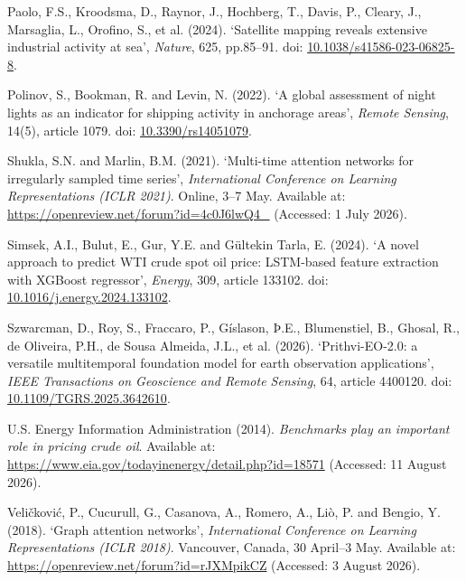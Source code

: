 \documentclass[
  british,
  12pt,
  oneside]{book}
\newlength{\cslhangindent}
\newenvironment{CSLReferences}[2] %
 {\begin{list}{}{%
  \setlength{\itemindent}{0pt}
  \setlength{\leftmargin}{0pt}
  \setlength{\parsep}{0pt}
  \ifodd #1
   \setlength{\leftmargin}{\cslhangindent}
   \setlength{\itemindent}{-1\cslhangindent}
  \fi
  \setlength{\itemsep}{#2\baselineskip}}}
 {\end{list}}
\begin{document}
\begin{CSLReferences}{0}{1}
Paolo, F.S., Kroodsma, D., Raynor, J., Hochberg, T., Davis, P., Cleary, J., Marsaglia, L., Orofino, S., et al. (2024). {`{Satellite mapping reveals extensive industrial activity at sea}'}, \emph{Nature}, 625, pp.85--91. doi: \href{https://doi.org/10.1038/s41586-023-06825-8}{10.1038/s41586-023-06825-8}.

Polinov, S., Bookman, R. and Levin, N. (2022). {`{A global assessment of night lights as an indicator for shipping activity in anchorage areas}'}, \emph{Remote Sensing}, 14(5), article 1079. doi: \href{https://doi.org/10.3390/rs14051079}{10.3390/rs14051079}.

Shukla, S.N. and Marlin, B.M. (2021). {`{Multi-time attention networks for irregularly sampled time series}'}, \emph{{International Conference on Learning Representations (ICLR 2021)}}. Online, 3--7 May. Available at: \url{https://openreview.net/forum?id=4c0J6lwQ4_} (Accessed: 1 July 2026).

Simsek, A.I., Bulut, E., Gur, Y.E. and Gültekin Tarla, E. (2024). {`{A novel approach to predict {WTI} crude spot oil price: {LSTM}-based feature extraction with {XGBoost} regressor}'}, \emph{Energy}, 309, article 133102. doi: \href{https://doi.org/10.1016/j.energy.2024.133102}{10.1016/j.energy.2024.133102}.

{Szwarcman, D., Roy, S., Fraccaro, P., Gíslason, Þ.E., Blumenstiel, B., Ghosal, R., de Oliveira, P.H., de Sousa Almeida, J.L., et al.} (2026). {`{Prithvi-{EO}-2.0: a versatile multitemporal foundation model for earth observation applications}'}, \emph{IEEE Transactions on Geoscience and Remote Sensing}, 64, article 4400120. doi: \href{https://doi.org/10.1109/TGRS.2025.3642610}{10.1109/TGRS.2025.3642610}.

U.S. Energy Information Administration (2014). \emph{{Benchmarks play an important role in pricing crude oil}}. Available at: \url{https://www.eia.gov/todayinenergy/detail.php?id=18571} (Accessed: 11 August 2026).

Veličković, P., Cucurull, G., Casanova, A., Romero, A., Liò, P. and Bengio, Y. (2018). {`{Graph attention networks}'}, \emph{{International Conference on Learning Representations (ICLR 2018)}}. Vancouver, Canada, 30 April--3 May. Available at: \url{https://openreview.net/forum?id=rJXMpikCZ} (Accessed: 3 August 2026).


\end{CSLReferences}
\end{document}

